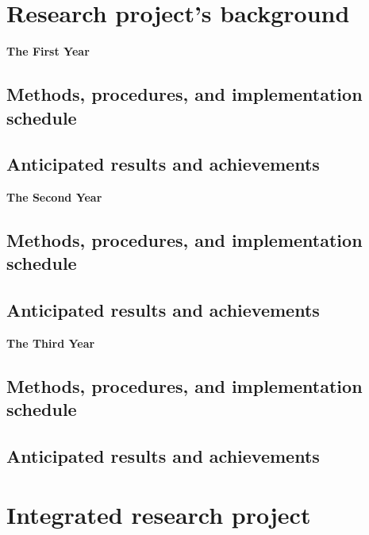\documentclass[12pt]{article}
\begin{document}
\section{Research project's background}


\bigskip
\noindent\textbf{The First Year}

\subsection{Methods, procedures, and implementation schedule}


\subsection{Anticipated results and achievements}


\bigskip
\noindent\textbf{The Second Year}

\subsection{Methods, procedures, and implementation schedule}


\subsection{Anticipated results and achievements}


\bigskip
\noindent\textbf{The Third Year}

\subsection{Methods, procedures, and implementation schedule}


\subsection{Anticipated results and achievements}


\section{Integrated research project}




\end{document}
